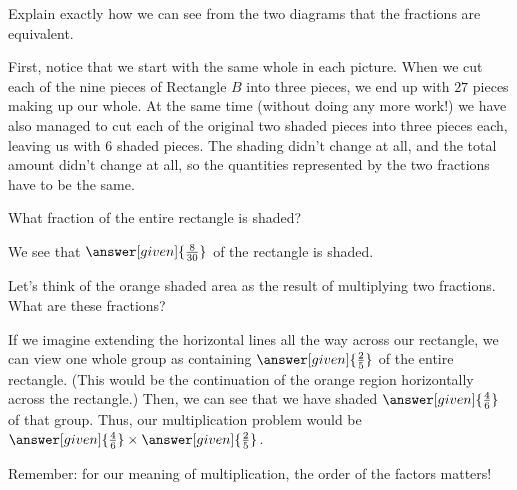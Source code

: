 \documentclass[nooutcomes]{ximera}
\begin{document}
\begin{problem}
\begin{problem}
\begin{problem}
 \begin{problem}
 Explain exactly how we can see from the two diagrams that the fractions are equivalent.
 \begin{freeResponse}
 \begin{hint}
 First, notice that we start with the same whole in each picture.  When we cut each of the nine pieces of Rectangle $B$ into three pieces, we end up with $27$ pieces making up our whole.  At the same time (without doing any more work!) we have also managed to cut each of the original two shaded pieces into three pieces each, leaving us with $6$ shaded pieces.  The shading didn't change at all, and the total amount didn't change at all, so the quantities represented by the two fractions have to be the same.
 \end{hint}
 \end{freeResponse}
 
 
\end{problem}
\end{problem}
\end{problem}
\end{problem}


\begin{problem}
What fraction of the entire rectangle is shaded?

\begin{center} \end{center}

\begin{prompt}
We see that $\answer[given]{\frac{8}{30}}$ of the rectangle is shaded.
\end{prompt}

\begin{problem}
	Let's think of the orange shaded area as the result of multiplying two fractions. What are these fractions?
	
	\begin{prompt}
	If we imagine extending the horizontal lines all the way across our rectangle, we can view one whole group as containing $\answer[given]{\frac{2}{5}}$ of the entire rectangle.  (This would be the continuation of the orange region horizontally across the rectangle.) Then, we can see that we have shaded $\answer[given]{\frac{4}{6}}$ of that group.  Thus, our multiplication problem would be $\answer[given]{\frac{4}{6}} \times \answer[given]{\frac{2}{5}}$.
	
	\begin{hint}
	Remember: for our meaning of multiplication, the order of the factors matters!
	\end{hint}
	\end{prompt}
\end{problem}

\end{problem}
\end{document}

